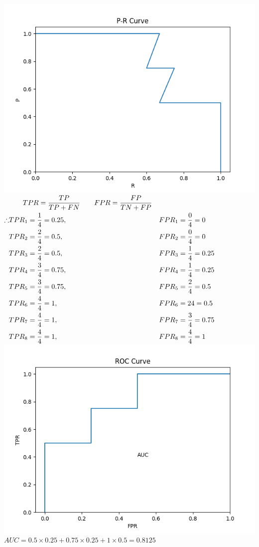 \documentclass[answers]{exam}  %
\begin{document}
\begin{questions}
\begin{solution}
		\includegraphics{Figure_1.png}
		$
		\begin{aligned}
			&\quad\quad TPR=\frac{TP}{TP+FN}\quad\quad FPR=\frac{FP}{TN+FP}\\
			\therefore&TPR_1=\frac{1}{4}=0.25,&&FPR_1=\frac{0}{4}=0\\
			&TPR_2=\frac{2}{4}=0.5,&&FPR_2=\frac{0}{4}=0\\
			&TPR_3=\frac{2}{4}=0.5,&&FPR_3=\frac{1}{4}=0.25\\
			&TPR_4=\frac{3}{4}=0.75,&&FPR_4=\frac{1}{4}=0.25\\
			&TPR_5=\frac{3}{4}=0.75,&&FPR_5=\frac{2}{4}=0.5\\
			&TPR_6=\frac{4}{4}=1,&&FPR_6={2}{4}=0.5\\
			&TPR_7=\frac{4}{4}=1,&&FPR_7=\frac{3}{4}=0.75\\
			&TPR_8=\frac{4}{4}=1,&&FPR_8=\frac44=1\\
		\end{aligned} \\
		$
		\includegraphics{Figure_2.png}
		$
		AUC = 0.5\times 0.25+0.75\times0.25+1\times0.5=0.8125
		$
	\end{solution}
\end{questions}
\end{document}
